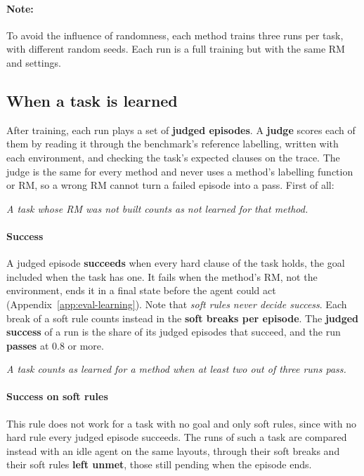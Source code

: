 \documentclass[11pt,english,listoffigures,listoftables]{tfgetsinf}
\newcommand{\keyidea}[1]{\par\smallskip\noindent\hspace*{0.6em}{\color{gray!55}\vrule width 1.5pt}\hspace{8pt}\parbox[t]{\dimexpr\linewidth-0.6em-9.5pt\relax}{\itshape #1}\par\smallskip}  %
\begin{document}
\paragraph{Note:} To avoid the influence of randomness, each method trains three runs per task, with different random seeds. Each run is a full training but with the same RM and settings.

\subsection{When a task is learned}
\label{sec:eval-learned}After training, each run plays a set of \textbf{judged episodes}. A \textbf{judge} scores each of them by reading it through the benchmark's reference labelling, written with each environment, and checking the task's expected clauses on the trace. The judge is the same for every method and never uses a method's labelling function or RM, so a wrong RM cannot turn a failed episode into a pass. First of all:

\keyidea{A task whose RM was not built counts as not learned for that method.}

\paragraph{Success} A judged episode \textbf{succeeds} when every hard clause of the task holds, the goal included when the task has one. It fails when the method's RM, not the environment, ends it in a final state before the agent could act (Appendix~\ref{app:eval-learning}). Note that \textit{soft rules never decide success}. Each break of a soft rule counts instead in the \textbf{soft breaks per episode}. The \textbf{judged success} of a run is the share of its judged episodes that succeed, and the run \textbf{passes} at 0.8 or more.

\keyidea{A task counts as learned for a method when at least two out of three runs pass.}

\paragraph{Success on soft rules}  This rule does not work for a task with no goal and only soft rules, since with no hard rule every judged episode succeeds. The runs of such a task are compared instead with an idle agent on the same layouts, through their soft breaks and their soft rules \textbf{left unmet}, those still pending when the episode ends. 
\end{document}
